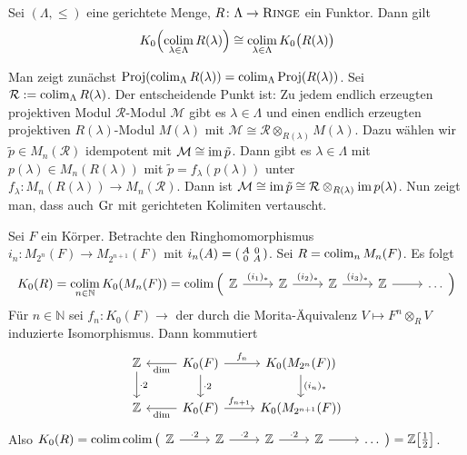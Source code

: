 \begin{satz}
	Sei $(\Lambda,\le)$ eine gerichtete Menge, $R \colon \Lambda \to \textsc{Ringe}$ ein Funktor.
	Dann gilt 
	\[
		K_0 \enbrace[\Big]{\colim_{\lambda \in \Lambda} R(\lambda)} \cong \colim_{\lambda \in \Lambda} K_0\enbrace[\big]{R(\lambda)}
	\]
\end{satz}
\begin{beweis}[Skizze]
	Man zeigt zunächst $\Proj \enbrace*{\colim_\Lambda R(\lambda)} = \colim_\Lambda \Proj \enbrace*{R(\lambda)}$.
	Sei $\mathcal{R} := \colim_\Lambda R(\lambda)$.
	Der entscheidende Punkt ist: Zu jedem endlich erzeugten projektiven Modul $\mathcal{R}$-Modul $\mathcal{M}$ gibt es $\lambda \in \Lambda$ und einen endlich erzeugten projektiven $R(\lambda)$-Modul $M(\lambda)$ mit $\mathcal{M} \cong \mathcal{R} \otimes_{R(\lambda)} M(\lambda)$.
	Dazu wählen wir $\tilde{p} \in M_n(\mathcal{R})$ idempotent mit $\mathcal{M} \cong \im \tilde{p}$.
	Dann gibt es $\lambda \in \Lambda$ mit $p(\lambda) \in M_n(R(\lambda))$ mit $\tilde{p} =f_\lambda(p(\lambda))$ unter $f_\lambda \colon M_n(R(\lambda)) \to M_n(\mathcal{R})$.
	Dann ist $\mathcal{M} \cong \im \tilde{p} \cong \mathcal{R} \otimes_{R(\lambda)} \im p(\lambda)$.
	Nun zeigt man, dass auch $\Gr$ mit gerichteten Kolimiten vertauscht.
\end{beweis}

\begin{beispiel}
	Sei $F$ ein Körper.
	Betrachte den Ringhomomorphismus $i_n \colon M_{2^n}(F) \to M_{2^{n+1}}(F)$ mit $i_n(A) = \begin{psmallmatrix} A & 0 \\ 0 & A \end{psmallmatrix}$.
	Sei $R= \colim_n M_n(F)$.
	Es folgt
	\[
		K_0(R) = \colim_{n \in \mathbb{N}} K_0 \enbrace*{M_n(F)} = \colim \Big(
		\begin{tikzcd}
			\mathbb{Z} \rar["(i_1)_*"] & \mathbb{Z} \rar["(i_2)_*"] & \mathbb{Z} \rar["(i_3)_*"]  & \mathbb{Z} \rar & \ldots 
		\end{tikzcd}
		\Big)
	\]
	Für $n \in \mathbb{N}$ sei $f_n \colon K_0(F) \to$ der durch die Morita-Äquivalenz $V \mapsto  F^n \otimes_R V$ induzierte Isomorphismus.
	Dann kommutiert
	\[
		\begin{tikzcd}
			\mathbb{Z} \dar["\cdot 2"] & K_0(F) \lar["\dim"] \dar["\cdot 2"] \rar["f_n"] & K_0 \enbrace*{M_{2^n}(F)} \dar["(i_n)_*"] \\
			\mathbb{Z} & K_0(F) \lar["\dim"] \rar["f_{n+1}"] & K_0 \enbrace*{M_{2^{n+1}} (F)}
		\end{tikzcd}
	\]
	Also $K_0(R) = \colim \colim \big(
		\begin{tikzcd}
			\mathbb{Z} \rar["\cdot 2"] & \mathbb{Z} \rar["\cdot 2"] & \mathbb{Z} \rar["\cdot 2"]  & \mathbb{Z} \rar & \ldots 
		\end{tikzcd}
		\big) = \mathbb{Z}\benbrace*{\frac{1}{2}}$.
\end{beispiel}
\newpage

